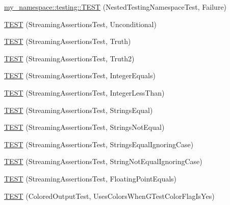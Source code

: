 \begin{DoxyCompactItemize}
\item 
\mbox{\hyperlink{namespacemy__namespace_1_1testing_aa568f6a68b9e42841f6da570ef62b623}{my\+\_\+namespace\+::testing\+::\+T\+E\+ST}} (Nested\+Testing\+Namespace\+Test, Failure)
\item 
\mbox{\hyperlink{googletest-master_2googletest_2test_2gtest__unittest_8cc_a1118ea85887fba8f2dd371d1add98cd5}{T\+E\+ST}} (Streaming\+Assertions\+Test, Unconditional)
\item 
\mbox{\hyperlink{googletest-master_2googletest_2test_2gtest__unittest_8cc_a5081f1d21cba3545511f97cc2be73da8}{T\+E\+ST}} (Streaming\+Assertions\+Test, Truth)
\item 
\mbox{\hyperlink{googletest-master_2googletest_2test_2gtest__unittest_8cc_aa957aa71ef10bd134fe2d6f702e264df}{T\+E\+ST}} (Streaming\+Assertions\+Test, Truth2)
\item 
\mbox{\hyperlink{googletest-master_2googletest_2test_2gtest__unittest_8cc_af9ba09b04506bd0e6b81221396535889}{T\+E\+ST}} (Streaming\+Assertions\+Test, Integer\+Equals)
\item 
\mbox{\hyperlink{googletest-master_2googletest_2test_2gtest__unittest_8cc_a8cfc5b3fcdf4593236319966b11dcc52}{T\+E\+ST}} (Streaming\+Assertions\+Test, Integer\+Less\+Than)
\item 
\mbox{\hyperlink{googletest-master_2googletest_2test_2gtest__unittest_8cc_a474efe55930f8fc5fa7baa2360d5cda0}{T\+E\+ST}} (Streaming\+Assertions\+Test, Strings\+Equal)
\item 
\mbox{\hyperlink{googletest-master_2googletest_2test_2gtest__unittest_8cc_a7393a1560b4cf4ab39cf3eb20ca10345}{T\+E\+ST}} (Streaming\+Assertions\+Test, Strings\+Not\+Equal)
\item 
\mbox{\hyperlink{googletest-master_2googletest_2test_2gtest__unittest_8cc_a82bafab19e101ad95823eb58e6676df0}{T\+E\+ST}} (Streaming\+Assertions\+Test, Strings\+Equal\+Ignoring\+Case)
\item 
\mbox{\hyperlink{googletest-master_2googletest_2test_2gtest__unittest_8cc_a83a5ce843f2acfe262c164ed6ce989b7}{T\+E\+ST}} (Streaming\+Assertions\+Test, String\+Not\+Equal\+Ignoring\+Case)
\item 
\mbox{\hyperlink{googletest-master_2googletest_2test_2gtest__unittest_8cc_a575e502c03840cac57d6dc6697e39240}{T\+E\+ST}} (Streaming\+Assertions\+Test, Floating\+Point\+Equals)
\item 
\mbox{\hyperlink{googletest-master_2googletest_2test_2gtest__unittest_8cc_aaf1acc03f393989f85aafd13c880fa44}{T\+E\+ST}} (Colored\+Output\+Test, Uses\+Colors\+When\+G\+Test\+Color\+Flag\+Is\+Yes)

\end{DoxyCompactItemize}
